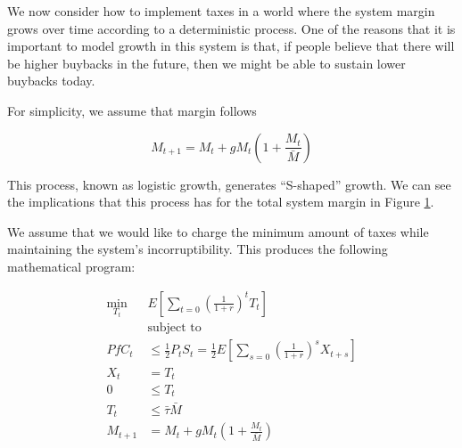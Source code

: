 
We now consider how to implement taxes in a world where the system margin grows over time
according to a deterministic process. One of the reasons that it is important to model growth in
this system is that, if people believe that there will be higher buybacks in the future, then we
might be able to sustain lower buybacks today.

For simplicity, we assume that margin follows

$$M_{t+1} = M_{t} + g M_{t} \left(1 + \frac{M_{t}}{\bar{M}} \right)$$

This process, known as logistic growth, generates ``S-shaped'' growth. We can see the implications
that this process has for the total system margin in Figure \ref{fig:dg_margin_growth}.

\begin{center}
  \begin{figure}[H]
    \label{fig:dg_margin_growth}
  \end{figure}
\end{center}

We assume that we would like to charge the minimum amount of taxes while maintaining the system's
incorruptibility. This produces the following mathematical program:

\begin{align*}
  \min_{T_t} \; &E \left[ \sum_{t=0} \left(\frac{1}{1 + r} \right)^t T_t \right] \\
  &\text{subject to} \\
  PfC_t &\leq \frac{1}{2} P_t S_t = \frac{1}{2} E \left[ \sum_{s=0} \left(\frac{1}{1 + r}\right)^s  X_{t + s} \right] \\
  X_{t} &= T_t \\
  0 &\leq T_t \\
  T_t &\leq \bar{\tau} \bar{M} \\
  M_{t+1} &= M_{t} + g M_{t} \left(1 + \frac{M_t}{\bar{M}} \right)
\end{align*}

